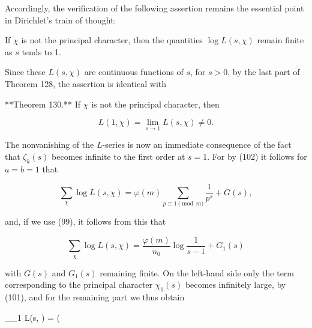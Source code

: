 Accordingly, the verification of the following assertion remains the essential point in Dirichlet’s train of thought:

If $\chi$ is not the principal character, then the quantities $\log L(s, \chi)$ remain finite as $s$ tends to 1.

Since these $L(s, \chi)$ are continuous functions of $s$, for $s > 0$, by the last part of Theorem 128, the assertion is identical with

**Theorem 130.** If $\chi$ is not the principal character, then

$$L(1, \chi) = \lim_{s \to 1} L(s, \chi) \neq 0.$$

The nonvanishing of the $L$-series is now an immediate consequence of the fact that $\zeta_k(s)$ becomes infinite to the first order at $s = 1$. For by (102) it follows for $a = b = 1$ that

$$\sum_{\chi} \log L(s, \chi) = \varphi(m) \sum_{p \equiv 1 \pmod{m}} \frac{1}{p^s} + G(s),$$

and, if we use (99), it follows from this that

$$\sum_{\chi} \log L(s, \chi) = \frac{\varphi(m)}{n_0} \log \frac{1}{s - 1} + G_1(s)$$

with $G(s)$ and $G_1(s)$ remaining finite. On the left-hand side only the term corresponding to the principal character $\chi_1(s)$ becomes infinitely large, by (101), and for the remaining part we thus obtain

$$\sum_{\chi \neq \chi_1} \log L(s, \chi) = \left( \frac
